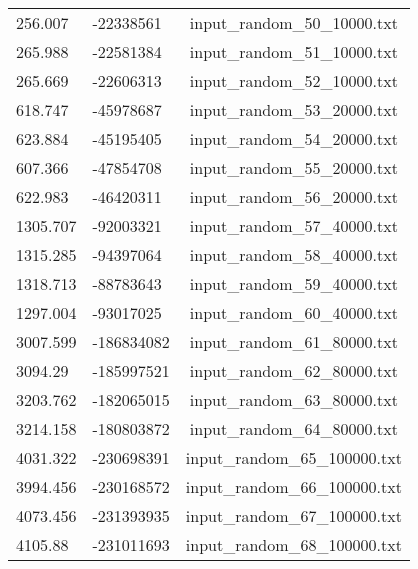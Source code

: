 \begin{longtable}[hb]{|l|l|c|}
    256.007 & -22338561 & input\_random\_50\_10000.txt \\
    265.988 & -22581384 & input\_random\_51\_10000.txt \\
    265.669 & -22606313 & input\_random\_52\_10000.txt \\
    618.747 & -45978687 & input\_random\_53\_20000.txt \\
    623.884 & -45195405 & input\_random\_54\_20000.txt \\
    607.366 & -47854708 & input\_random\_55\_20000.txt \\
    622.983 & -46420311 & input\_random\_56\_20000.txt \\
    1305.707 & -92003321 & input\_random\_57\_40000.txt \\
    1315.285 & -94397064 & input\_random\_58\_40000.txt \\
    1318.713 & -88783643 & input\_random\_59\_40000.txt \\
    1297.004 & -93017025 & input\_random\_60\_40000.txt \\
    3007.599 & -186834082 & input\_random\_61\_80000.txt \\
    3094.29 & -185997521 & input\_random\_62\_80000.txt \\
    3203.762 & -182065015 & input\_random\_63\_80000.txt \\
    3214.158 & -180803872 & input\_random\_64\_80000.txt \\
    4031.322 & -230698391 & input\_random\_65\_100000.txt \\
    3994.456 & -230168572 & input\_random\_66\_100000.txt \\
    4073.456 & -231393935 & input\_random\_67\_100000.txt \\
    4105.88 & -231011693 & input\_random\_68\_100000.txt \\
    \hline
\end{longtable}
